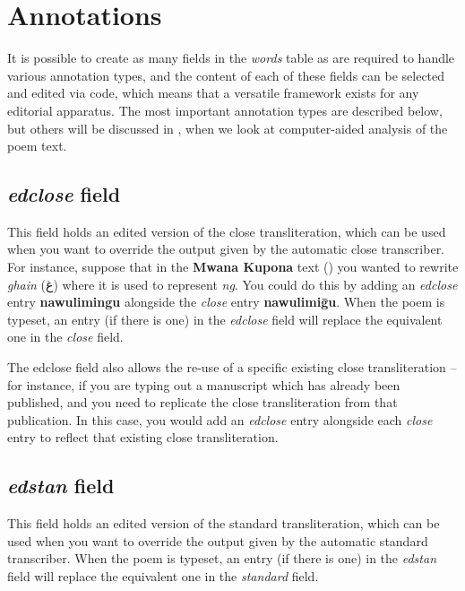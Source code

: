\section{Annotations}
\label{s:annotation}

It is possible to create as many fields in the \textit{words} table as are required to handle various annotation types, and the content of each of these fields can be selected and edited via code, which means that a versatile framework exists for any editorial apparatus.  The  most important annotation types are described below, but others will be discussed in , when we look at computer-aided analysis of the poem text.

\subsection{\textit{edclose} field}
\label{ss:edclose}
This field holds an edited version of the close transliteration, which can be used when you want to override the output given by the automatic close transcriber.   For instance, suppose that in the \textbf{Mwana Kupona} text () you wanted to rewrite \textit{ghain} (\textarabic{غ}) where it is used to represent \textit{ng}.  You could do this by adding an \textit{edclose} entry \textbf{nawulimingu} alongside the \textit{close} entry \textbf{nawulimiḡu}.  When the poem is typeset, an entry (if there is one) in the \textit{edclose} field will replace the equivalent one in the \textit{close} field.

The edclose field also allows the re-use of a specific existing close transliteration -- for instance, if you are typing out a manuscript which has already been published, and you need to replicate the close transliteration from that publication. In this case, you would add an \textit{edclose} entry alongside each \textit{close} entry to reflect that existing close transliteration.

\subsection{\textit{edstan} field}

This field holds an edited version of the standard transliteration, which can be used when you want to override the output given by the automatic standard transcriber.  When the poem is typeset, an entry (if there is one) in the \textit{edstan} field will replace the equivalent one in the \textit{standard} field.


